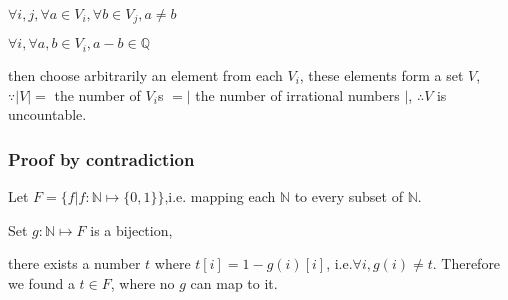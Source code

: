\documentclass[12pt,a4paper]{ctexrep}
\begin{document}
$\forall i,j, \forall a\in V_i, \forall b \in V_j, a \neq b$

$\forall i, \forall a,b \in V_i, a-b \in \mathbb{Q}$

then choose arbitrarily an element from each $V_i$, these elements form a set $V$, $\because |V| = $ the number of $V_i$s $= |$ the number of irrational numbers $|$, $\therefore V $ is uncountable.

\subsubsection{Proof by contradiction}
Let $F = \{f|f:\mathbb{N}\mapsto\{0,1\}\}$,i.e. mapping each $\mathbb{N}$ to every subset of $\mathbb{N}$.

Set $g:\mathbb{N}\mapsto F$ is a bijection, 

there exists a number $t$ where $t[i] = 1-g(i)[i]$, i.e.$\forall i, g(i) \neq t$. Therefore we found a $t \in F$, where no $g$ can map to it. 

\ifdebug
\end{document}
